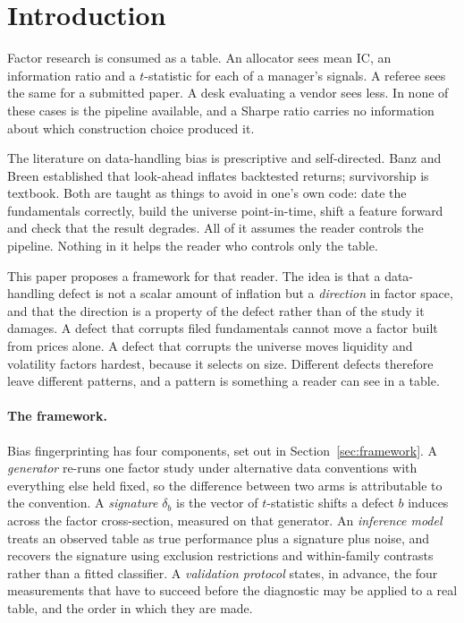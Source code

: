 \documentclass[11pt]{article}
\begin{document}
\section{Introduction}

Factor research is consumed as a table. An allocator sees mean IC, an information ratio
and a $t$-statistic for each of a manager's signals. A referee sees the same for a
submitted paper. A desk evaluating a vendor sees less. In none of these cases is the
pipeline available, and a Sharpe ratio carries no information about which construction
choice produced it.

The literature on data-handling bias is prescriptive and self-directed. Banz and Breen
\cite{banz1986} established that look-ahead inflates backtested returns; survivorship is
textbook. Both are taught as things to avoid in one's own code: date the fundamentals
correctly, build the universe point-in-time, shift a feature forward and check that the
result degrades. All of it assumes the reader controls the pipeline. Nothing in it helps
the reader who controls only the table.

This paper proposes a framework for that reader. The idea is that a data-handling defect
is not a scalar amount of inflation but a \emph{direction} in factor space, and that the
direction is a property of the defect rather than of the study it damages. A defect that
corrupts filed fundamentals cannot move a factor built from prices alone. A defect that
corrupts the universe moves liquidity and volatility factors hardest, because it selects
on size. Different defects therefore leave different patterns, and a pattern is something
a reader can see in a table.

\paragraph{The framework.} Bias fingerprinting has four components, set out in
Section~\ref{sec:framework}. A \emph{generator} re-runs one factor study under
alternative data conventions with everything else held fixed, so the difference between
two arms is attributable to the convention. A \emph{signature} $\delta_b$ is the vector of
$t$-statistic shifts a defect $b$ induces across the factor cross-section, measured on
that generator. An \emph{inference model} treats an observed table as true performance
plus a signature plus noise, and recovers the signature using exclusion restrictions and
within-family contrasts rather than a fitted classifier. A \emph{validation protocol}
states, in advance, the four measurements that have to succeed before the diagnostic may
be applied to a real table, and the order in which they are made.
\end{document}
